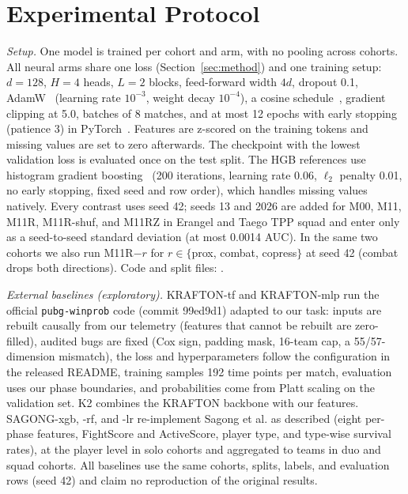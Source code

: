\section{Experimental Protocol}\label{sec:experiments}

\emph{Setup.} One model is trained per cohort and arm, with no pooling across cohorts. All neural arms share one loss (Section~\ref{sec:method}) and one training setup: $d=128$, $H=4$ heads, $L=2$ blocks, feed-forward width $4d$, dropout 0.1, AdamW~\cite{loshchilov2019adamw} (learning rate $10^{-3}$, weight decay $10^{-4}$), a cosine schedule~\cite{loshchilov2017sgdr}, gradient clipping at 5.0, batches of 8 matches, and at most 12 epochs with early stopping (patience 3) in PyTorch~\cite{paszke2019pytorch}. Features are z-scored on the training tokens and missing values are set to zero afterwards. The checkpoint with the lowest validation loss is evaluated once on the test split. The HGB references use histogram gradient boosting~\cite{friedman2001gbm,pedregosa2011sklearn} (200 iterations, learning rate 0.06, $\ell_2$ penalty 0.01, no early stopping, fixed seed and row order), which handles missing values natively. Every contrast uses seed 42; seeds 13 and 2026 are added for M00, M11, M11R, M11R-shuf, and M11RZ in Erangel and Taego TPP squad and enter only as a seed-to-seed standard deviation (at most 0.0014 AUC). In the same two cohorts we also run M11R$-r$ for $r\in\{$prox, combat, copress$\}$ at seed 42 (combat drops both directions). Code and split files: .

\emph{External baselines (exploratory).} KRAFTON-tf and KRAFTON-mlp run the official \texttt{pubg-winprob} code (commit 99ed9d1) adapted to our task: inputs are rebuilt causally from our telemetry (features that cannot be rebuilt are zero-filled), audited bugs are fixed (Cox sign, padding mask, 16-team cap, a 55/57-dimension mismatch), the loss and hyperparameters follow the configuration in the released README, training samples 192 time points per match, evaluation uses our phase boundaries, and probabilities come from Platt scaling on the validation set. K2 combines the KRAFTON backbone with our features. SAGONG-xgb, -rf, and -lr re-implement Sagong et al. as described (eight per-phase features, FightScore and ActiveScore, player type, and type-wise survival rates), at the player level in solo cohorts and aggregated to teams in duo and squad cohorts. All baselines use the same cohorts, splits, labels, and evaluation rows (seed 42) and claim no reproduction of the original results.

